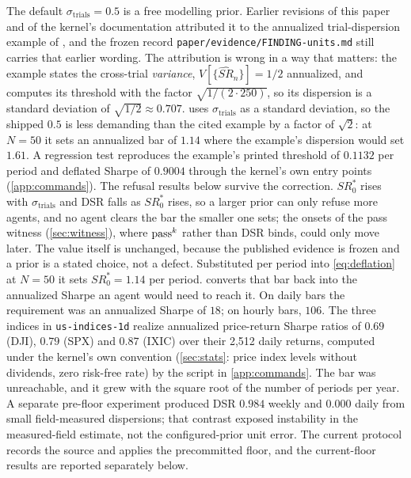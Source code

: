 The default $\sigma_{\text{trials}} = 0.5$ is a free modelling prior. Earlier revisions of this paper and of the kernel's documentation attributed it to the annualized trial-dispersion example of \citet[pp.~102--103]{bailey2014deflated}, and the frozen record \texttt{paper/evidence/FINDING-units.md} still carries that earlier wording. The attribution is wrong in a way that matters: the example states the cross-trial \emph{variance}, $V[\{\widehat{SR}_n\}]=1/2$ annualized, and computes its threshold with the factor $\sqrt{1/(2\cdot 250)}$, so its dispersion is a standard deviation of $\sqrt{1/2}\approx 0.707$.  uses $\sigma_{\text{trials}}$ as a standard deviation, so the shipped $0.5$ is less demanding than the cited example by a factor of $\sqrt{2}$: at $N=50$ it sets an annualized bar of $1.14$ where the example's dispersion would set $1.61$. A regression test reproduces the example's printed threshold of $0.1132$ per period and deflated Sharpe of $0.9004$ through the kernel's own entry points (\cref{app:commands}). The refusal results below survive the correction. $SR^{*}_{0}$ rises with $\sigma_{\text{trials}}$ and DSR falls as $SR^{*}_{0}$ rises, so a larger prior can only refuse more agents, and no agent clears the bar the smaller one sets; the onsets of the pass witness (\cref{sec:witness}), where $\text{pass}^{k}$ rather than DSR binds, could only move later. The value itself is unchanged, because the published evidence is frozen and a prior is a stated choice, not a defect. Substituted per period into \cref{eq:deflation} at $N = 50$ it sets $SR^{*}_{0} = 1.14$ per period.  converts that bar back into the annualized Sharpe an agent would need to reach it. On daily bars the requirement was an annualized Sharpe of $18$; on hourly bars, $106$. The three indices in \texttt{us-indices-1d} realize annualized price-return Sharpe ratios of $0.69$ (DJI), $0.79$ (SPX) and $0.87$ (IXIC) over their 2{,}512 daily returns, computed under the kernel's own convention (\cref{sec:stats}: price index levels without dividends, zero risk-free rate) by the script in \cref{app:commands}. The bar was unreachable, and it grew with the square root of the number of periods per year. A separate pre-floor experiment produced DSR $0.984$ weekly and $0.000$ daily from small field-measured dispersions; that contrast exposed instability in the measured-field estimate, not the configured-prior unit error. The current protocol records the source and applies the precommitted floor, and the current-floor results are reported separately below.

